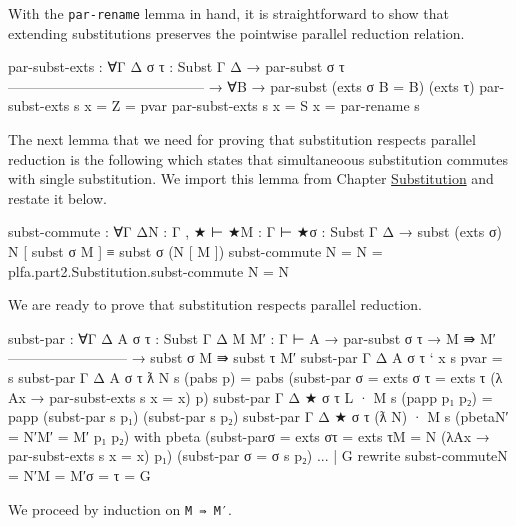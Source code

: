 With the \texttt{par-rename} lemma in hand, it is straightforward to
show that extending substitutions preserves the pointwise parallel
reduction relation.

\begin{fence}
\begin{code}
par-subst-exts : ∀{Γ Δ} {σ τ : Subst Γ Δ}
  → par-subst σ τ
    ------------------------------------------
  → ∀{B} → par-subst (exts σ {B = B}) (exts τ)
par-subst-exts s {x = Z} = pvar
par-subst-exts s {x = S x} = par-rename s
\end{code}
\end{fence}

The next lemma that we need for proving that substitution respects
parallel reduction is the following which states that simultaneoous
substitution commutes with single substitution. We import this lemma
from Chapter \protect\hyperlink{Substitution}{Substitution} and restate
it below.

\begin{fence}
\begin{code}
subst-commute : ∀{Γ Δ}{N : Γ , ★ ⊢ ★}{M : Γ ⊢ ★}{σ : Subst Γ Δ }
  → subst (exts σ) N [ subst σ M ] ≡ subst σ (N [ M ])
subst-commute {N = N} = plfa.part2.Substitution.subst-commute {N = N}
\end{code}
\end{fence}

We are ready to prove that substitution respects parallel reduction.

\begin{fence}
\begin{code}
subst-par : ∀{Γ Δ A} {σ τ : Subst Γ Δ} {M M′ : Γ ⊢ A}
  → par-subst σ τ  →  M ⇛ M′
    --------------------------
  → subst σ M ⇛ subst τ M′
subst-par {Γ} {Δ} {A} {σ} {τ} {` x} s pvar = s
subst-par {Γ} {Δ} {A} {σ} {τ} {ƛ N} s (pabs p) =
  pabs (subst-par {σ = exts σ} {τ = exts τ}
        (λ {A}{x} → par-subst-exts s {x = x}) p)
subst-par {Γ} {Δ} {★} {σ} {τ} {L · M} s (papp p₁ p₂) =
  papp (subst-par s p₁) (subst-par s p₂)
subst-par {Γ} {Δ} {★} {σ} {τ} {(ƛ N) · M} s (pbeta{N′ = N′}{M′ = M′} p₁ p₂)
    with pbeta (subst-par{σ = exts σ}{τ = exts τ}{M = N}
                        (λ{A}{x} → par-subst-exts s {x = x}) p₁)
               (subst-par {σ = σ} s p₂)
... | G rewrite subst-commute{N = N′}{M = M′}{σ = τ} = G
\end{code}
\end{fence}

We proceed by induction on \texttt{M\ ⇛\ M′}.

